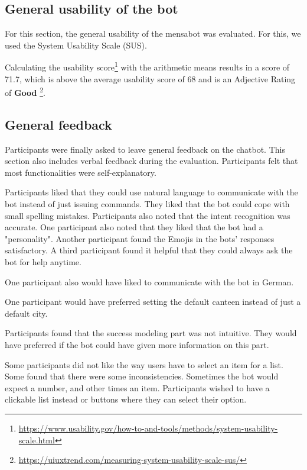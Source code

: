 \subsection{General usability of the bot}
For this section, the general usability of the mensabot was evaluated. For this, we used the System Usability Scale (SUS).

Calculating the usability score\footnote{\label{note1}\url{https://www.usability.gov/how-to-and-tools/methods/system-usability-scale.html}} with the arithmetic means results in a score of 71.7, which is above the average usability score of 68 and is an Adjective Rating of \textbf{Good} \footnote{\url{https://uiuxtrend.com/measuring-system-usability-scale-sus/}}.




\subsection{General feedback}
Participants were finally asked to leave general feedback on the chatbot. This section also includes verbal feedback during the evaluation. 
Participants felt that most functionalities were self-explanatory. 

Participants liked that they could use natural language to communicate with the bot instead of just issuing commands.
They liked that the bot could cope with small spelling mistakes.
Participants also noted that the intent recognition was accurate.
One participant also noted that they liked that the bot had a "personality". Another participant found the Emojis in the bots' responses satisfactory. A third participant found it helpful that they could always ask the bot for help anytime.

One participant also would have liked to communicate with the bot in German.

One participant would have preferred setting the default canteen instead of just a default city. 

Participants found that the success modeling part was not intuitive. They would have preferred if the bot could have given more information on this part. 

Some participants did not like the way users have to select an item for a list. Some found that there were some inconsistencies. Sometimes the bot would expect a number, and other times an item. 
Participants wished to have a clickable list instead or buttons where they can select their option.

